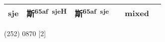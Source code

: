 \documentclass[14pt,a4paper]{scrartcl}
\begin{document}
\begin{longtable}[c]{@{}llllll@{}}
\begin{minipage}[t]{0.14\columnwidth}
sje
\strut\end{minipage} &
\begin{minipage}[t]{0.14\columnwidth}\raggedright\strut
斯\textsuperscript{65af~sjeH}
\strut\end{minipage} &
\begin{minipage}[t]{0.14\columnwidth}\raggedright\strut
斯\textsuperscript{65af~sje}
\strut\end{minipage} &
\begin{minipage}[t]{0.14\columnwidth}\raggedright\strut
\strut\end{minipage} &
\begin{minipage}[t]{0.14\columnwidth}\raggedright\strut
mixed
\strut\end{minipage}\tabularnewline
\bottomrule
\end{longtable}

(252) 0870 {[}2{]}
\end{document}

